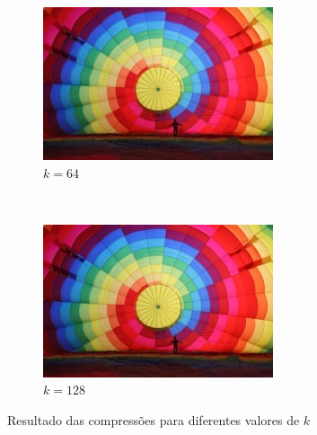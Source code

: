 \documentclass[brazil,times]{abnt}
\begin{document}
\begin{figure}
        \begin{subfigure}[b]{0.5\textwidth}
                \centering
                \includegraphics[width=\textwidth]{imagens/balloon256-compressed-64.jpg}
                \caption{$k = 64$}
        \end{subfigure}%
        ~ %
        \begin{subfigure}[b]{0.5\textwidth}
                \centering
                \includegraphics[width=\textwidth]{imagens/balloon256-compressed-128.jpg}
                \caption{$k = 128$}
        \end{subfigure}

        \caption{Resultado das compressões para diferentes valores de $k$}
	\end{figure}
\end{document}
